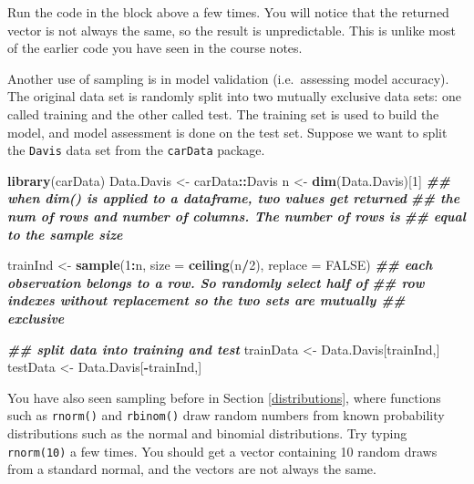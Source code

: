 \documentclass[
]{book}
\newenvironment{Shaded}{\begin{snugshade}}{\end{snugshade}}
\newcommand{\AttributeTok}[1]{\textcolor[rgb]{0.13,0.29,0.53}{#1}}
\newcommand{\ConstantTok}[1]{\textcolor[rgb]{0.56,0.35,0.01}{#1}}
\newcommand{\DecValTok}[1]{\textcolor[rgb]{0.00,0.00,0.81}{#1}}
\newcommand{\DocumentationTok}[1]{\textcolor[rgb]{0.56,0.35,0.01}{\textbf{\textit{#1}}}}
\newcommand{\FunctionTok}[1]{\textcolor[rgb]{0.13,0.29,0.53}{\textbf{#1}}}
\newcommand{\NormalTok}[1]{#1}
\newcommand{\OtherTok}[1]{\textcolor[rgb]{0.56,0.35,0.01}{#1}}
\newcommand{\SpecialCharTok}[1]{\textcolor[rgb]{0.81,0.36,0.00}{\textbf{#1}}}
\theoremstyle{definition}
\theoremstyle{definition}
\theoremstyle{definition}
\theoremstyle{definition}
\theoremstyle{remark}
\begin{document}
Run the code in the block above a few times. You will notice that the returned vector is not always the same, so the result is unpredictable. This is unlike most of the earlier code you have seen in the course notes.

Another use of sampling is in model validation (i.e.~assessing model accuracy). The original data set is randomly split into two mutually exclusive data sets: one called training and the other called test. The training set is used to build the model, and model assessment is done on the test set. Suppose we want to split the \texttt{Davis} data set from the \texttt{carData} package.

\begin{Shaded}
\begin{Highlighting}[]
\FunctionTok{library}\NormalTok{(carData)}
\NormalTok{Data.Davis }\OtherTok{\textless{}{-}}\NormalTok{ carData}\SpecialCharTok{::}\NormalTok{Davis}
\NormalTok{n }\OtherTok{\textless{}{-}} \FunctionTok{dim}\NormalTok{(Data.Davis)[}\DecValTok{1}\NormalTok{]}
\DocumentationTok{\#\# when dim() is applied to a dataframe, two values get returned}
\DocumentationTok{\#\# the num of rows and number of columns. The number of rows is }
\DocumentationTok{\#\# equal to the sample size}

\NormalTok{trainInd }\OtherTok{\textless{}{-}} \FunctionTok{sample}\NormalTok{(}\DecValTok{1}\SpecialCharTok{:}\NormalTok{n, }\AttributeTok{size =} \FunctionTok{ceiling}\NormalTok{(n}\SpecialCharTok{/}\DecValTok{2}\NormalTok{), }\AttributeTok{replace =} \ConstantTok{FALSE}\NormalTok{)}
\DocumentationTok{\#\# each observation belongs to a row. So randomly select half of}
\DocumentationTok{\#\# row indexes without replacement so the two sets are mutually \#\# exclusive}

\DocumentationTok{\#\# split data into training and test}
\NormalTok{trainData }\OtherTok{\textless{}{-}}\NormalTok{ Data.Davis[trainInd,]}
\NormalTok{testData }\OtherTok{\textless{}{-}}\NormalTok{ Data.Davis[}\SpecialCharTok{{-}}\NormalTok{trainInd,]}
\end{Highlighting}
\end{Shaded}

You have also seen sampling before in Section \ref{distributions}, where functions such as \texttt{rnorm()} and \texttt{rbinom()} draw random numbers from known probability distributions such as the normal and binomial distributions. Try typing \texttt{rnorm(10)} a few times. You should get a vector containing 10 random draws from a standard normal, and the vectors are not always the same.
\end{document}
